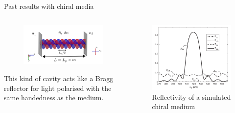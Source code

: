 \documentclass[aspectratio=169]{beamer}
\begin{document}
\begin{frame}{Past results with chiral media}
	\begin{columns}
		\begin{column}{0.5\textwidth}
			\begin{figure}
				\centering
				\includegraphics[width=\linewidth]{images/simple_cavity}
				\caption{}
			\end{figure}
			This kind of cavity acts like a Bragg reflector for light polarised with the same handedness as the medium.
		\end{column}
		\begin{column}{0.5\textwidth}
			\begin{figure}
				\centering
				\includegraphics[width=0.8\linewidth]{images/martin_result}
				\caption{Reflectivity of a simulated chiral medium {\tiny {}}}
			\end{figure}
		\end{column}
	\end{columns}
\end{frame}
\end{document}
